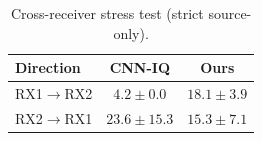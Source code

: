 \begin{table}[!t]
\centering
\caption{Cross-receiver stress test (strict source-only).}
\label{tab:cross_receiver}
\footnotesize
\setlength{\tabcolsep}{4pt}
\renewcommand{\arraystretch}{1.05}
\begin{tabular}{@{}lcc@{}}
\toprule
Direction & CNN-IQ & Ours \\
\midrule
RX1$\rightarrow$RX2 & $4.2{\pm}0.0$ & $18.1{\pm}3.9$ \\
RX2$\rightarrow$RX1 & $23.6{\pm}15.3$ & $15.3{\pm}7.1$ \\
\bottomrule
\end{tabular}
\end{table}
